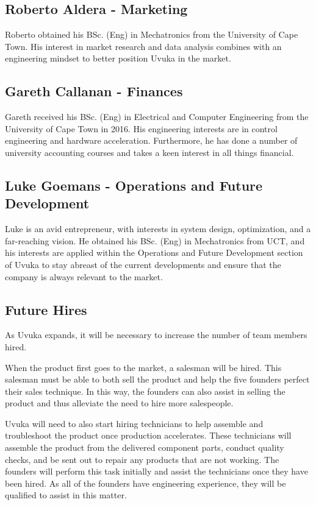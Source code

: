 \subsection{Roberto Aldera - Marketing}
Roberto obtained his BSc. (Eng) in Mechatronics from the University of Cape Town. His interest in market research and data analysis combines with an engineering mindset to better position Uvuka in the market.

\subsection{Gareth Callanan - Finances}
Gareth received his BSc. (Eng) in Electrical and Computer Engineering from the University of Cape Town in 2016. His engineering interests are in control engineering and hardware acceleration. Furthermore, he has done a number of university accounting courses and takes a keen interest in all things financial. 

\subsection{Luke Goemans - Operations and Future Development}
Luke is an avid entrepreneur, with interests in system design, optimization, and a far-reaching vision. He obtained his BSc. (Eng) in Mechatronics from UCT, and his interests are applied within the Operations and Future Development section of Uvuka to stay abreast of the current developments and ensure that the company is always relevant to the market.

\subsection{Future Hires}

As Uvuka expands, it will be necessary to increase the number of team members hired. 

When the product first goes to the market, a salesman will be hired. This salesman must be able to both sell the product and help the five founders perfect their sales technique. In this way, the founders can also assist in selling the product and thus alleviate the need to hire more salespeople.

Uvuka will need to also start hiring technicians to help assemble and troubleshoot the product once production accelerates. These technicians will assemble the product from the delivered component parts, conduct quality checks, and be sent out to repair any products that are not working. The founders will perform this task initially and assist the technicians once they have been hired. As all of the founders have engineering experience, they will be qualified to assist in this matter.

